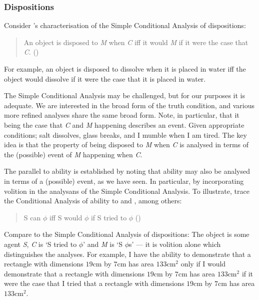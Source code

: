 \subsubsection{Dispositions}
\label{sec:dispositions}

\begin{note}
  Consider \citeauthor{Choi:2021wg}'s characterisation of the Simple Conditional Analysis of dispositions:
  \begin{quote}
    An object is disposed to \emph{M} when \emph{C} iff it would \emph{M} if it were the case that \emph{C}.\nolinebreak
    \mbox{}\hfill\mbox{(\citeyear{Choi:2021wg})}
  \end{quote}
  For example, an object is disposed to dissolve when it is placed in water iff the object would dissolve if it were the case that it is placed in water.

  The Simple Conditional Analysis may be challenged, but for our purposes it is adequate.
  We are interested in the broad form of the truth condition, and various more refined analyses share the same broad form.
  Note, in particular, that it being the case that \emph{C} and \emph{M} happening describes an event.
  Given appropriate conditions; salt dissolves, glass breaks, and I mumble when I am tired.
  The key idea is that the property of being disposed to \emph{M} when \emph{C} is analysed in terms of the (possible) event of \emph{M} happening when \emph{C}.

  The parallel to ability is established by noting that ability may also be analysed in terms of a (possible) event, as we have seen.
  In particular, by incorporating volition in the analysans of the Simple Conditional Analysis.
  To illustrate, \citeauthor{Mandelkern:2017aa} trace the Conditional Analysis of ability  to \textcite{Hume:1748tp} and \textcite{Moore:1912te}, among others:
  \begin{quote}
    S can \(\phi\) iff S would \(\phi\) if S tried to \(\phi\)\nolinebreak
    \mbox{}\hfill\mbox{(\citeyear[Cf.][308]{Mandelkern:2017aa})}
  \end{quote}
  Compare to the Simple Conditional Analysis of dispositions:
  The object is some agent \emph{S}, \emph{C} is `S tried to \(\phi\)' and \emph{M} is `S \(\phi\)s' --- it is volition alone which distinguishes the analyses.
  For example, I have the ability to demonstrate that a rectangle with dimensions \(19\text{cm}\) by \(7\text{cm}\) has area \(133\text{cm}^{2}\) only if I would demonstrate that a rectangle with dimensions \(19\text{cm}\) by \(7\text{cm}\) has area \(133\text{cm}^{2}\) if it were the case that I tried that a rectangle with dimensions \(19\text{cm}\) by \(7\text{cm}\) has area \(133\text{cm}^{2}\).
\end{note}

